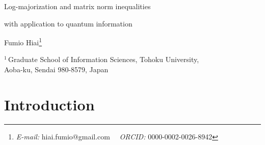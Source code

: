 \documentclass[11pt,reqno]{article}
\numberwithin{equation}{section}
\begin{document}
\allowdisplaybreaks

\centerline{\LARGE Log-majorization and matrix norm inequalities}
\medskip
\centerline{\LARGE with application to quantum information}

\bigskip
\bigskip
\centerline{\large
Fumio Hiai\footnote{{\it E-mail:} hiai.fumio@gmail.com
\ \ {\it ORCID:} 0000-0002-0026-8942}}

\medskip
\begin{center}
$^1$\,Graduate School of Information Sciences, Tohoku University, \\
Aoba-ku, Sendai 980-8579, Japan
\end{center}

\medskip

\begin{abstract}
We are concerned with log-majorization for matrices in connection with the multivariate Golden--Thompson
trace inequality and the Karcher mean (i.e., a multivariate extension of the weighted geometric mean).
We show an extension of Araki's log-majorization and apply it to the $\alpha$-$z$-R\'enyi divergence in
quantum information. We discuss the equality cases in the multivariate trace inequality of Golden--Thompson
type and in the norm inequality for the Karcher mean. The paper includes an appendix to correct the proof
of the author's old result on the equality case in the norm inequality for the weighted geometric mean.

\bigskip\noindent
{\it 2020 Mathematics Subject Classification:}
15A45, 47A64, 81P17

\medskip\noindent
{\it Keywords and phrases:}
Positive (semi)definite matrix, Log-majorization, Weighted geometric mean, Karcher mean,
Unitarily invariant norm, $\alpha$-$z$-R\'enyi divergence

\end{abstract}

\section{Introduction}\label{Sec-1}
\end{document}
